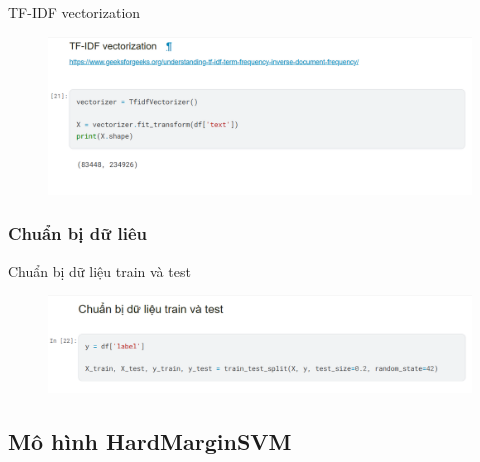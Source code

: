 \documentclass[serif, aspectratio=169]{beamer}
\begin{document}
	\begin{frame}{TF-IDF vectorization}
		\begin{figure}
			\centering
			\includegraphics[width=1\linewidth]{pic/tfidf-apply.png}
			\label{fig:tfidf-apply}
		\end{figure}
	\end{frame}
	
	\subsubsection{Chuẩn bị dữ liêu}
	\begin{frame}{Chuẩn bị dữ liệu train và test}
		\begin{figure}
			\centering
			\includegraphics[width=1\linewidth]{pic/train_test_split.png}
			\label{fig:train-test-split}
		\end{figure}
	\end{frame}
	
	\subsection{Mô hình HardMarginSVM}
\end{document}
